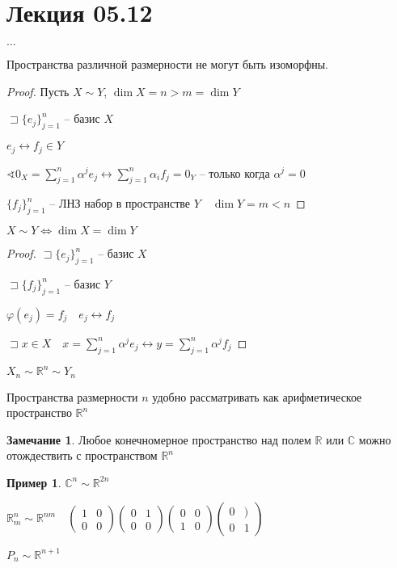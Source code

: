 \documentclass{book}
\newcommand\R{\ensuremath{\mathbb{R}}}
\renewcommand\C{\ensuremath{\mathbb{C}}}
\theoremstyle{definition}
\newtheorem*{note}{Замечание}
\newtheorem*{example}{Пример}
\begin{document}
\section{Лекция 05.12}
$\ldots$

\begin{lemma}
    Пространства различной размерности не могут быть изоморфны.
\end{lemma}
\begin{proof}
    Пусть $X\sim Y$, $\dim X = n > m = \dim Y$

    $\sqsupset \{e_j\}_{j=1}^n$ -- базис $X$

     $e_j \leftrightarrow f_j\in Y$

     $\sphericalangle 0_X = \sum_{j=1}^{n} \alpha^je_j \leftrightarrow \sum_{j=1}^{n} \alpha_if_j = 0_Y$ -- только когда $\alpha^j = 0$

     $\{f_j\}_{j=1}^n$ -- ЛНЗ набор в пространстве  $Y\quad \dim Y = m<n$
\end{proof}

\begin{lemma}
    $X\sim Y \iff \dim X = \dim Y$
\end{lemma}
\begin{proof}
    $\sqsupset \{e_j\}_{j=1}^n$ -- базис $X$

    $\sqsupset \{f_j\}_{j=1}^n$ -- базис $Y$ 

    $\varphi(e_j) = f_j\quad e_j \leftrightarrow f_j$

     $\sqsupset x\in X\quad x = \sum_{j=1}^{n} \alpha^je_j \leftrightarrow y = \sum_{j=1}^{n} \alpha^jf_j$
\end{proof}

$X_n\sim \R^n\sim Y_n$

Пространства размерности $n$ удобно рассматривать как арифметическое пространство  $\R^n$

\begin{note}
    Любое конечномерное пространство над полем $\R$ или $\C$ можно отождествить с пространством $\R^n$
\end{note}

\begin{example}
    $\C^n \sim \R^{2n}$

    $\R^n_m \sim  \R^{nm}\quad \begin{pmatrix} 1&0\\0&0 \end{pmatrix} \begin{pmatrix} 0&1\\0&0 \end{pmatrix} \begin{pmatrix} 0&0\\1&0 \end{pmatrix} \begin{pmatrix} 0&)\\0&1 \end{pmatrix} $

    $P_n \sim \R^{n+1}$
\end{example}
\end{document}
